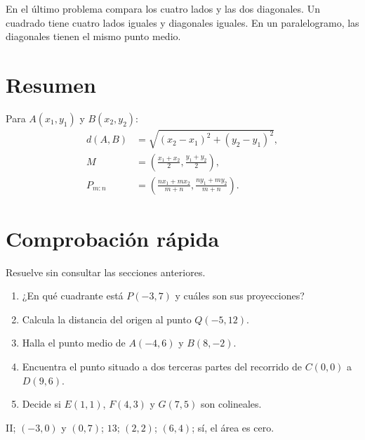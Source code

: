 \begin{hints}
En el último problema compara los cuatro lados y las dos diagonales. Un
cuadrado tiene cuatro lados iguales y diagonales iguales.
En un paralelogramo, las diagonales tienen el mismo punto medio.
\end{hints}

\enlargethispage{5\baselineskip}
\section*{Resumen}

\begin{properties}
Para $A(x_1,y_1)$ y $B(x_2,y_2)$:
\[
\begin{aligned}
d(A,B)&=\sqrt{(x_2-x_1)^2+(y_2-y_1)^2},\\[2mm]
M&=\left(\frac{x_1+x_2}{2},\frac{y_1+y_2}{2}\right),\\[2mm]
P_{m:n}&=\left(\frac{nx_1+mx_2}{m+n},
\frac{ny_1+my_2}{m+n}\right).
\end{aligned}
\]
\end{properties}

\section*{Comprobación rápida}

Resuelve sin consultar las secciones anteriores.

\begin{enumerate}
  \item ¿En qué cuadrante está $P(-3,7)$ y cuáles son sus proyecciones?
  \item Calcula la distancia del origen al punto $Q(-5,12)$.
  \item Halla el punto medio de $A(-4,6)$ y $B(8,-2)$.
  \item Encuentra el punto situado a dos terceras partes del recorrido de
  $C(0,0)$ a $D(9,6)$.
  \item Decide si $E(1,1)$, $F(4,3)$ y $G(7,5)$ son colineales.
\end{enumerate}

\begin{hints}[title={Resultados}]
II; $(-3,0)$ y $(0,7)$; \quad $13$; \quad $(2,2)$; \quad $(6,4)$;
\quad sí, el área es cero.
\end{hints}

